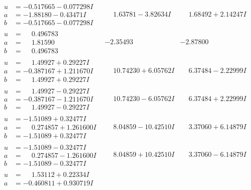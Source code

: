 \documentclass[1p]{elsarticle_modified}
\theoremstyle{definition}
\begin{document}
$$\begin{array}{c|c|c}
\begin{aligned}
u &= -0.517665 - 0.077298 I \\
a &= -1.88180 - 0.43471 I \\
b &= -0.517665 - 0.077298 I\end{aligned}
 & \phantom{-}1.63781 - 3.82634 I & \phantom{-}1.68492 + 2.14247 I \\ \hline\begin{aligned}
u &= \phantom{-}0.496783\phantom{ +0.000000I} \\
a &= \phantom{-}1.81590\phantom{ +0.000000I} \\
b &= \phantom{-}0.496783\phantom{ +0.000000I}\end{aligned}
 & -2.35493\phantom{ +0.000000I} & -2.87800\phantom{ +0.000000I} \\ \hline\begin{aligned}
u &= \phantom{-}1.49927 + 0.29227 I \\
a &= -0.387167 + 1.211670 I \\
b &= \phantom{-}1.49927 + 0.29227 I\end{aligned}
 & \phantom{-}10.74230 + 6.05762 I & \phantom{-}6.37484 - 2.22999 I \\ \hline\begin{aligned}
u &= \phantom{-}1.49927 - 0.29227 I \\
a &= -0.387167 - 1.211670 I \\
b &= \phantom{-}1.49927 - 0.29227 I\end{aligned}
 & \phantom{-}10.74230 - 6.05762 I & \phantom{-}6.37484 + 2.22999 I \\ \hline\begin{aligned}
u &= -1.51089 + 0.32477 I \\
a &= \phantom{-}0.274857 + 1.261600 I \\
b &= -1.51089 + 0.32477 I\end{aligned}
 & \phantom{-}8.04859 - 10.42510 I & \phantom{-}3.37060 + 6.14879 I \\ \hline\begin{aligned}
u &= -1.51089 - 0.32477 I \\
a &= \phantom{-}0.274857 - 1.261600 I \\
b &= -1.51089 - 0.32477 I\end{aligned}
 & \phantom{-}8.04859 + 10.42510 I & \phantom{-}3.37060 - 6.14879 I \\ \hline\begin{aligned}
u &= \phantom{-}1.53112 + 0.22334 I \\
a &= -0.460811 + 0.930719 I \\

\end{aligned}
\end{array}$$
\end{document}
